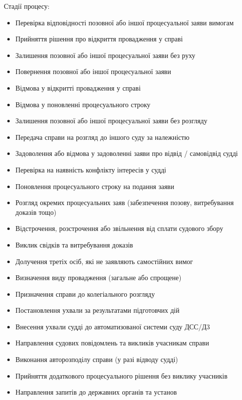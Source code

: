 \documentclass{article}
\begin{document}
Стадії процесу:

\begin{itemize}
    \item Перевірка відповідності позовної або іншої процесуальної заяви вимогам
    \item Прийняття рішення про відкриття провадження у справі
    \item Залишення позовної або іншої процесуальної заяви без руху
    \item Повернення позовної або іншої процесуальної заяви
    \item Відмова у відкритті провадження у справі
    \item Відмова у поновленні процесуального строку
    \item Залишення позовної або іншої процесуальної заяви без розгляду
    \item Передача справи на розгляд до іншого суду за належністю
    \item Задоволення або відмова у задоволенні заяви про відвід / самовідвід судді
    \item Перевірка на наявність конфлікту інтересів у судді
    \item Поновлення процесуального строку на подання заяви
    \item Розгляд окремих процесуальних заяв (забезпечення позову, витребування доказів тощо)
    \item Відстрочення, розстрочення або звільнення від сплати судового збору
    \item Виклик свідків та витребування доказів
    \item Долучення третіх осіб, які не заявляють самостійних вимог
    \item Визначення виду провадження (загальне або спрощене)
    \item Призначення справи до колегіального розгляду
    \item Постановлення ухвали за результатами підготовчих дій
    \item Внесення ухвали судді до автоматизованої системи суду ДСС/Д3
    \item Направлення судових повідомлень та викликів учасникам справи
    \item Виконання авторозподілу справи (у разі відводу судді)
    \item Прийняття додаткового процесуального рішення без виклику учасників
    \item Направлення запитів до державних органів та установ
\end{itemize}
\end{document}
